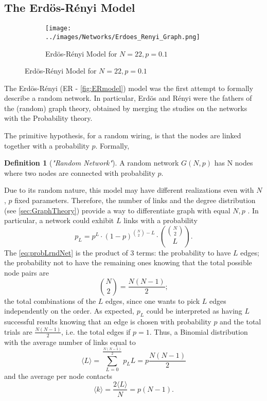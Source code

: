 \documentclass[a4paper,10pt, oneside]{book} %
\theoremstyle{definition}
\newtheorem{definition}{Definition}[section]
\begin{document}
\subsection{The Erdös-Rényi Model}
\label{sec:ER_model}

\begin{figure}[ht]
    \begin{subfigure}{\textwidth}
        \texttt{[image: ../images/Networks/Erdoes\_Renyi\_Graph.png]}
        \centering
        \caption{Erdös-Rényi Model for $N = 22, p = 0.1$}
        \label{fig:ERmodel}
    \end{subfigure}
\end{figure}

The Erdös-Rényi (ER - \autoref{fig:ERmodel}) model was the first attempt to formally describe a random network. In particular, Erdös and Rényi were the fathers of the (random) graph theory, obtained by merging the studies on the networks with the Probability theory.

The primitive hypothesis, for a random wiring, is that the nodes are linked together with a probability $p$. Formally,

\begin{definition}[\textit{"Random Network"}]
A random network $G(N,p)$ has N nodes where two nodes are connected with probability $p$.
\end{definition} 

Due to its random nature, this model may have different realizations even with $N$, $p$ fixed parameters. Therefore, the number of links and the degree distribution (see \autoref{sec:GraphTheory}) provide a way to differentiate graph with equal $ N,p$ . In particular, a network could exhibit $L$ links with a probability
\begin{equation}
	\label{eq:probLrndNet}
	p_L = p^L \cdot (1-p)^{ \binom{N}{2} - L } \cdot \binom{\binom{N}{2}}{L}.
\end{equation}
The \autoref{eq:probLrndNet} is the product of $3$ terms: the probability to have $L$ edges; the probability not to have the remaining ones knowing that the total possible node pairs are \[ \binom{N}{2} = \frac{N(N-1)}{2}; \] the total combinations of the $L$ edges, since one wants to pick $L$ edges independently on the order.
As expected, $p_L$ could be interpreted as having $L$ successful results knowing that an edge is chosen with probability $p$ and the total trials are $\frac{N(N-1)}{2}$, i.e. the total edges if $ p = 1$. Thus, a Binomial distribution with the average number of links equal to
\[ \langle L \rangle = \sum_{L = 0}^{\frac{N(N-1)}{2}} p_L L = p\frac{N(N-1)}{2} \label{eq:meanL} \] and the average per node contacts \[ \langle k\rangle = \frac{2\langle L \rangle}{N} = p(N-1) \label{eq:meank}. \]
\end{document}
